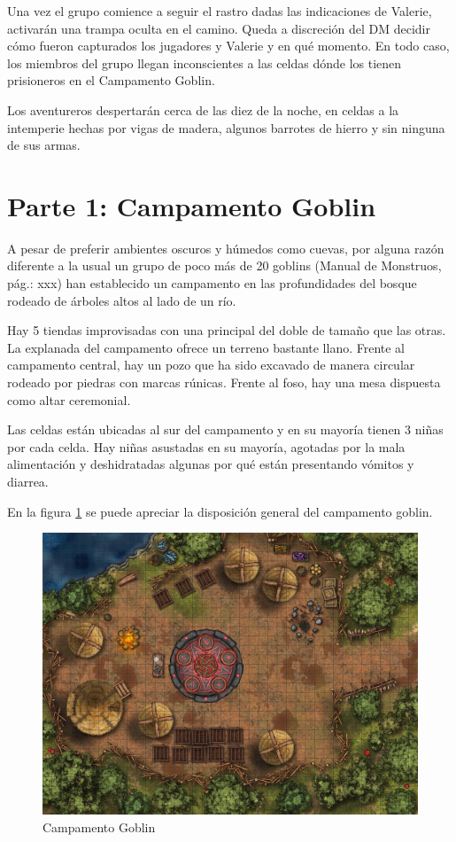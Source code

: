 \documentclass[10pt,twoside,twocolumn,openany]{dndbook}
\begin{document}
Una vez el grupo comience a seguir el rastro dadas las indicaciones de Valerie, activarán una 
trampa oculta en el camino. Queda a discreción del DM decidir cómo fueron capturados los 
jugadores y Valerie y en qué momento. En todo caso, los miembros del grupo llegan inconscientes 
a las celdas dónde los tienen prisioneros en el Campamento Goblin.

Los aventureros despertarán cerca de las diez de la noche, en celdas a la intemperie hechas por 
vigas de madera, algunos barrotes de hierro y sin ninguna de sus armas.


\section{Parte 1: Campamento Goblin}

A pesar de preferir ambientes oscuros y húmedos como cuevas, por alguna razón diferente a la usual 
un grupo de poco más de 20 goblins (Manual de Monstruos, pág.: xxx) han establecido un campamento 
en las profundidades del bosque rodeado de árboles altos al lado de un río. 

Hay 5 tiendas improvisadas con una principal del doble de tamaño que las otras. La explanada del 
campamento ofrece un terreno bastante llano. Frente al campamento central, hay un pozo que ha sido 
excavado de manera circular rodeado por piedras con marcas rúnicas. Frente al foso, hay una mesa 
dispuesta como altar ceremonial.

Las celdas están ubicadas al sur del campamento y en su mayoría tienen 3 niñas por cada celda. Hay 
niñas asustadas en su mayoría, agotadas por la mala alimentación y deshidratadas algunas por qué 
están presentando vómitos y diarrea.

En la figura \ref{fig:camp1} se puede apreciar la disposición general del campamento goblin.

\begin{figure}[hb!]
  \centering
  \includegraphics[width=\textwidth]{maps/goblin-camp.jpg}
  \caption{Campamento Goblin}
  \label{fig:camp1}
\end{figure}
\end{document}
